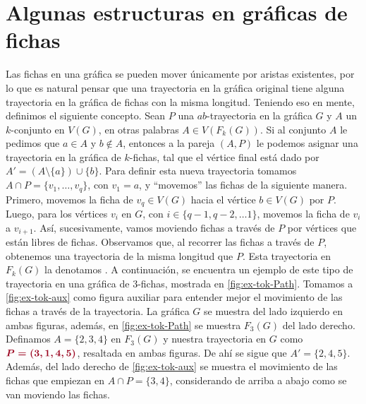 \section{Algunas estructuras en gr\'aficas de fichas}%
\label{sec:}

Las fichas en una gr\'afica se pueden mover \'unicamente por aristas existentes,
por lo que es natural pensar que una trayectoria en la gr\'afica original tiene
alguna trayectoria en la gr\'afica de fichas con la misma longitud. Teniendo eso
en mente, definimos el siguiente concepto. Sean $P$ una $ab$-trayectoria en la
gr\'afica $G$ y $A$ un $k$-conjunto en $V(G)$, en otras palabras $A \in
V(F_k(G))$. Si al conjunto $A$ le pedimos que $a\in A$ y $b \notin A$, entonces
a la pareja $(A,P)$ le podemos asignar una trayectoria en la gr\'afica de
$k$-fichas, tal que el v\'ertice final est\'a dado por $A'=(A \setminus \{a\})
\cup \{b\}$. Para definir esta nueva trayectoria tomamos $A\cap P =\{v_1, \dots,
v_q\}$, con $v_1 = a$, y ``movemos'' las fichas de la siguiente manera. Primero,
movemos la ficha de $v_q \in V(G)$ hacia el v\'ertice $b \in V(G)$ por $P$.
Luego, para los v\'ertices $v_i$ en $G$, con $i \in \{q-1, q-2, \dots 1\}$,
movemos la ficha de $v_i$ a $v_{i+1}$. As\'i, sucesivamente, vamos moviendo
fichas a trav\'es de $P$ por v\'ertices que est\'an libres de fichas. Observamos
que, al recorrer las fichas a trav\'es de $P$, obtenemos una trayectoria de la
misma longitud que $P$. Esta trayectoria en $F_k(G)$ la denotamos
. A continuaci\'on, se encuentra un
ejemplo de este tipo de trayectoria en una gr\'afica de $3$-fichas, mostrada en
\cref{fig:ex-tok-Path}. Tomamos a \cref{fig:ex-tok-aux} como figura auxiliar
para entender mejor el movimiento de las fichas a trav\'es de la trayectoria. La
gr\'afica $G$ se muestra del lado izquierdo en ambas figuras, adem\'as, en
\cref{fig:ex-tok-Path} se muestra $F_3(G)$ del lado derecho. Definamos
$A=\{2,3,4\}$ en $F_3(G)$ y nuestra trayectoria en $G$ como
${\color{vino}\boldsymbol {P= (3,1,4,5)}}$, resaltada en ambas figuras. De ah\'i
se sigue que $A'=\{2,4,5\}$. Adem\'as, del lado derecho de \cref{fig:ex-tok-aux}
se muestra el movimiento de las fichas que empiezan en $A \cap P =\{3,4\}$,
considerando de arriba a abajo como se van moviendo las fichas.

